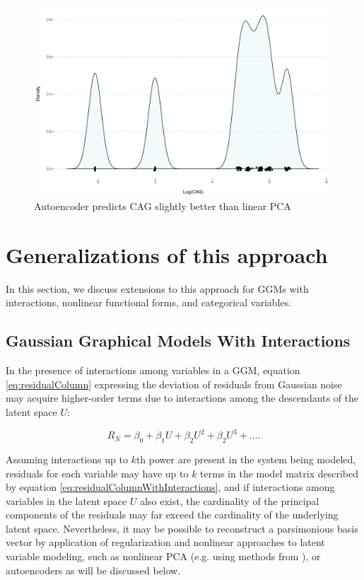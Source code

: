 \documentclass{article}
\begin{document}
\begin{figure}[ht!]
  \centering
    \includegraphics[width=\linewidth,page=2]{./images/cagPlots.pdf}
    \caption{\label{fig_cag_linear} Autoencoder predicts CAG slightly better than linear PCA}
\end{figure}
\medskip


\section{Generalizations of this approach}
In this section, we discuss extensions to this approach for GGMs with interactions, nonlinear functional forms, and categorical variables. 

\subsection{Gaussian Graphical Models With Interactions}
In the presence of interactions among variables in a GGM, equation \ref{eq:residualColumn} expressing the deviation of residuals from Gaussian noise may acquire higher-order terms due to interactions among the descendants of the latent space $U$:

\begin{equation}
R_N = \beta_0 + \beta_1 U + \beta_2 U^2 + \beta_2 U^3 + \dots.
\label{eq:residualColumnWithInteractions}
\end{equation}

Assuming interactions up to $k$th power are present in the system being modeled, residuals for each variable may have up to $k$ terms in the model matrix described by equation \ref{eq:residualColumnWithInteractions}, and if interactions among variables in the latent space $U$ also exist, the cardinality of the principal components of the residuals may far exceed the cardinality of the underlying latent space.  Nevertheless, it may be possible to reconstruct a parsimonious basis vector by application of regularization and nonlinear approaches to latent variable modeling, such as nonlinear PCA (e.g. using methods from \cite{karatzoglou_kernlab_2004}), or autoencoders \cite{louizos_causal_2017} as will be discussed below.
\end{document}
